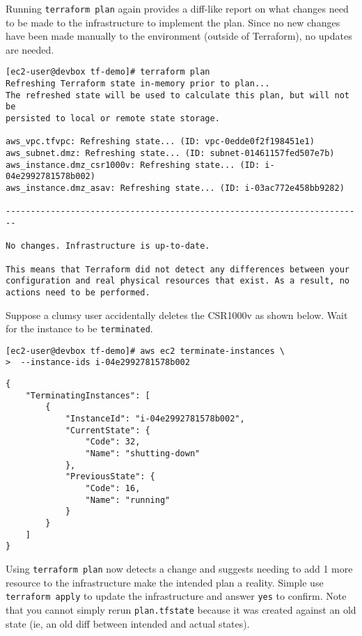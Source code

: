 Running \verb|terraform plan| again provides a diff-like report on what changes
need to be made to the infrastructure to implement the plan. Since no new
changes have been made manually to the environment (outside of Terraform), no
updates are needed.

\begin{verbatim}
[ec2-user@devbox tf-demo]# terraform plan
Refreshing Terraform state in-memory prior to plan...
The refreshed state will be used to calculate this plan, but will not be
persisted to local or remote state storage.

aws_vpc.tfvpc: Refreshing state... (ID: vpc-0edde0f2f198451e1)
aws_subnet.dmz: Refreshing state... (ID: subnet-01461157fed507e7b)
aws_instance.dmz_csr1000v: Refreshing state... (ID: i-04e2992781578b002)
aws_instance.dmz_asav: Refreshing state... (ID: i-03ac772e458bb9282)

------------------------------------------------------------------------

No changes. Infrastructure is up-to-date.

This means that Terraform did not detect any differences between your
configuration and real physical resources that exist. As a result, no
actions need to be performed.
\end{verbatim}

Suppose a clumsy user accidentally deletes the CSR1000v as shown below. Wait
for the instance to be \verb|terminated|.

\begin{verbatim}
[ec2-user@devbox tf-demo]# aws ec2 terminate-instances \
>  --instance-ids i-04e2992781578b002
\end{verbatim}

\begin{verbatim}
{
    "TerminatingInstances": [
        {
            "InstanceId": "i-04e2992781578b002",
            "CurrentState": {
                "Code": 32,
                "Name": "shutting-down"
            },
            "PreviousState": {
                "Code": 16,
                "Name": "running"
            }
        }
    ]
}
\end{verbatim}

Using \verb|terraform plan| now detects a change and suggests needing to add 1 more
resource to the infrastructure make the intended plan a reality. Simple use
\verb|terraform apply| to update the infrastructure and answer \verb|yes| to confirm.
Note that you cannot simply rerun \verb|plan.tfstate| because it was created
against an old state (ie, an old diff between intended and actual states).

